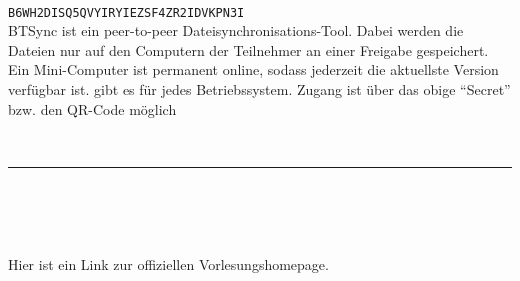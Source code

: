 \begin{minipage}{4cm}
\end{minipage}
\hfill
\begin{minipage}{\dieBreite}
	\\
	\texttt{B6WH2DISQ5QVYIRYIEZSF4ZR2IDVKPN3I} \smallskip\\
	BTSync ist ein peer-to-peer Dateisynchronisations-Tool. Dabei werden die Dateien nur auf den Computern der Teilnehmer an einer Freigabe gespeichert. Ein Mini-Computer ist permanent 
	online, sodass jederzeit die aktuellste Version verfügbar ist.  gibt es für jedes Betriebssystem.
	Zugang ist über das obige \enquote{Secret} bzw. den QR-Code möglich
\end{minipage}\\[1cm]
\hrule \mbox{ }\\[1cm]
\begin{minipage}{4cm}
	\qrcode[height=3.3cm, version=6]{\homepage}
\end{minipage}
\hfill
\begin{minipage}{\dieBreite}
	\\
	\resizebox{\dieBreite}{!}{\footnotesize\url{\homepage}}\smallskip\\
	Hier ist ein Link zur offiziellen Vorlesungshomepage.
\end{minipage}
\newpage
